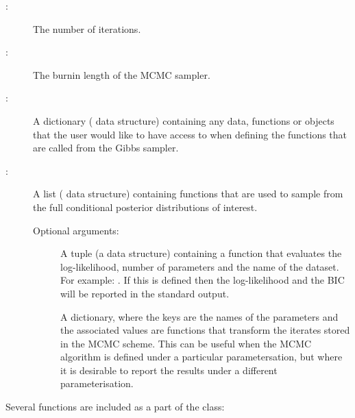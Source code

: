 \documentclass[article]{jss}
\begin{document}
\begin{description}
\item[:]  The number of iterations. 
\item[:]  The burnin length of the MCMC sampler. 
\item[:] A dictionary ( data structure)
  containing any data, functions or objects that the user would like
  to have access to when defining the functions that are called from
  the Gibbs sampler.
\item[:] A list ( data structure)
  containing functions that are used to sample from the full
  conditional posterior distributions of interest.
\item[] Optional arguments:
  
  \begin{description}
  \item[] A tuple (a  data structure)
    containing a function that evaluates the log-likelihood, number of
    parameters and the name of the dataset. For example: .  If this is defined then the
    log-likelihood and the BIC will be reported in the standard
    output.
  \item[] A dictionary, where the keys are the names
    of the parameters and the associated values are functions that
    transform the iterates stored in the MCMC scheme. This can be
    useful when the MCMC algorithm is defined under a particular
    parametersation, but where it is desirable to report the results
    under a different parameterisation.
  \end{description}
\end{description}
Several functions are included as a part of the class:
\end{document}
